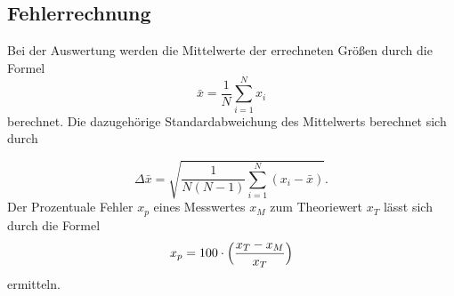 \subsection{Fehlerrechnung}
Bei der Auswertung werden die Mittelwerte 
der errechneten Größen durch die Formel
\begin{equation}
    \bar{x}=\frac{1}{N}\sum_{i=1}^N x_i
    \label{eq:2}
\end{equation}
berechnet. Die dazugehörige Standardabweichung
des Mittelwerts berechnet sich durch

 \begin{equation}
     \Delta\bar{x}=\sqrt{\frac{1}{N(N-1)}\sum_{i=1}^N (x_i-\bar{x})}.
     \label{eq:5}
 \end{equation}
\noindent Der Prozentuale Fehler $x_p$ eines
Messwertes $x_M$ zum Theoriewert $x_T$ lässt sich durch
die Formel
\begin{equation}
    x_p=100 \cdot \Bigl(\frac{x_T-x_M}{x_T}\Bigr)
    \label{eq:16}
\end{equation}
\noindent ermitteln.
